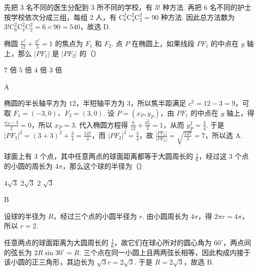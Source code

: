 \documentclass[UTF8,a4paper,oneside,11pt]{ctexbook}
\begin{document}
\begin{solution}
先把 \(3\) 名不同的医生分配到 \(3\) 所不同的学校，有 \(3!\) 种方法. 再把 \(6\) 名不同的护士按学校依次分成三组，每组 \(2\) 人，有
\(\mathrm C_{6}^{2}\mathrm C_{4}^{2}\mathrm C_{2}^{2}=90\) 种方法. 因此总方法数为
\(3!\mathrm C_{6}^{2}\mathrm C_{4}^{2}\mathrm C_{2}^{2}=6\times90=540\)，故选 D.
\end{solution}

\begin{problem}
椭圆 \(\frac{x^2}{12} + \frac{y^2}{3} = 1\) 的焦点为 \(F_{1}\) 和 \(F_{2}\). 点 \(P\) 在椭圆上，如果线段 \(PF_{1}\) 的中点在 \(y\) 轴上，那么 \(|PF_{1}|\) 是 \(|PF_{2}|\) 的（\quad）

\choices
    {\(7\) 倍}
    {\(5\) 倍}
    {\(4\) 倍}
    {\(3\) 倍}
\end{problem}

\begin{answer}
A
\end{answer}

\begin{solution}
椭圆的半长轴平方为 \(12\)，半短轴平方为 \(3\)，所以焦半距满足 \(c^{2}=12-3=9\)，可取 \(F_{1}=(-3,0)\)、\(F_{2}=(3,0)\). 设 \(P=(x_{P},y_{P})\)，由 \(PF_{1}\) 的中点在 \(y\) 轴上，得
\(\frac{x_{P}-3}{2}=0\)，所以 \(x_{P}=3\). 代入椭圆方程得
\(\frac{9}{12}+\frac{y_{P}^{2}}{3}=1\)，从而 \(y_{P}^{2}=\frac{3}{4}\). 于是
\(|PF_{1}|^{2}=(3+3)^{2}+\frac{3}{4}=\frac{147}{4}\)，而 \(|PF_{2}|^{2}=\frac{3}{4}\)，故
\(\frac{|PF_{1}|}{|PF_{2}|}=\sqrt{\frac{147}{3}}=7\)，所以选 A.
\end{solution}

\begin{problem}
球面上有 \(3\) 个点，其中任意两点的球面距离都等于大圆周长的 \(\frac{1}{6}\)，经过这 \(3\) 个点的小圆的周长为 \(4\pi\)，那么这个球的半径为（\quad）

\choices
    {\(4\sqrt{3}\)}
    {\(2\sqrt{3}\)}
    {\(2\)}
    {\(\sqrt{3}\)}
\end{problem}

\begin{answer}
B
\end{answer}

\begin{solution}
设球的半径为 \(R\)，经过三个点的小圆半径为 \(r\). 由小圆周长为 \(4\pi\)，得 \(2\pi r=4\pi\)，所以 \(r=2\).

任意两点的球面距离为大圆周长的 \(\frac{1}{6}\)，故它们在球心所对的圆心角为 \(60^{\circ}\)，两点间的弦长为
\(2R\sin30^{\circ}=R\). 三个点在同一小圆上且两两弦长相等，因此构成内接于该小圆的正三角形，其边长为 \(\sqrt{3}r=2\sqrt{3}\). 于是 \(R=2\sqrt{3}\)，故选 B.
\end{solution}
\end{document}
